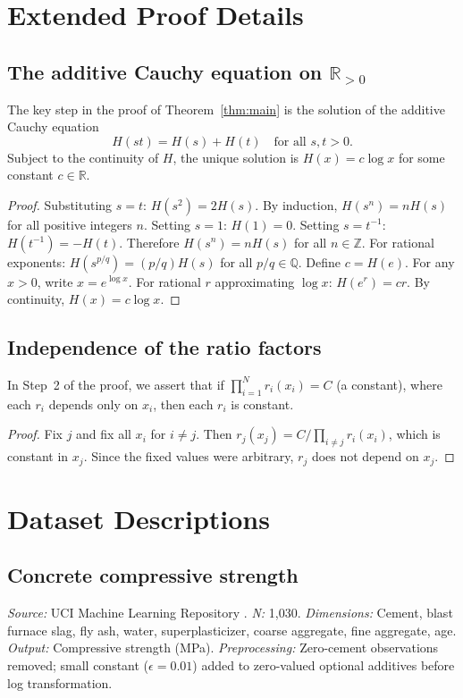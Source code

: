 \documentclass[12pt, a4paper]{article}
\theoremstyle{definition}
\theoremstyle{remark}
\newcommand{\R}{\mathbb{R}}
\newcommand{\Rp}{\mathbb{R}_{>0}}
\begin{document}
\section{Extended Proof Details}\label{app:proof}

\subsection{The additive Cauchy equation on $\Rp$}

The key step in the proof of Theorem~\ref{thm:main} is the solution of the additive Cauchy equation
\begin{equation}\label{eq:addcauchy}
H(st) = H(s) + H(t) \quad \text{for all } s, t > 0.
\end{equation}
Subject to the continuity of $H$, the unique solution is $H(x) = c \log x$ for some constant $c \in \R$.

\begin{proof}
Substituting $s = t$: $H(s^2) = 2H(s)$. By induction, $H(s^n) = nH(s)$ for all positive integers $n$. Setting $s = 1$: $H(1) = 0$. Setting $s = t^{-1}$: $H(t^{-1}) = -H(t)$. Therefore $H(s^n) = nH(s)$ for all $n \in \mathbb{Z}$. For rational exponents: $H(s^{p/q}) = (p/q)H(s)$ for all $p/q \in \mathbb{Q}$. Define $c = H(e)$. For any $x > 0$, write $x = e^{\log x}$. For rational $r$ approximating $\log x$: $H(e^r) = cr$. By continuity, $H(x) = c \log x$.
\end{proof}

\subsection{Independence of the ratio factors}

In Step~2 of the proof, we assert that if $\prod_{i=1}^{N} r_i(x_i) = C$ (a constant), where each $r_i$ depends only on $x_i$, then each $r_i$ is constant.

\begin{proof}
Fix $j$ and fix all $x_i$ for $i \neq j$. Then $r_j(x_j) = C / \prod_{i \neq j} r_i(x_i)$, which is constant in $x_j$. Since the fixed values were arbitrary, $r_j$ does not depend on $x_j$.
\end{proof}


\section{Dataset Descriptions}\label{app:datasets}

\subsection{Concrete compressive strength}
\textit{Source:} UCI Machine Learning Repository \cite{yeh1998}. \textit{N:} 1,030. \textit{Dimensions:} Cement, blast furnace slag, fly ash, water, superplasticizer, coarse aggregate, fine aggregate, age. \textit{Output:} Compressive strength (MPa). \textit{Preprocessing:} Zero-cement observations removed; small constant ($\epsilon = 0.01$) added to zero-valued optional additives before log transformation.
\end{document}
